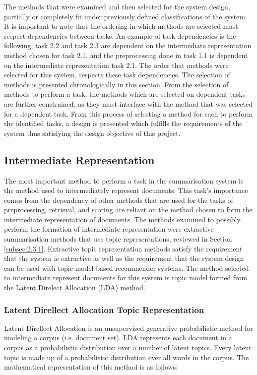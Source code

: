 The methods that were examined and then selected for the system design, partially or completely fit under previously defined classifications of the system. It is important to note that the ordering in which methods are selected must respect dependencies between tasks. An example of task dependencies is the following, task 2.2 and task 2.3 are dependent on the intermediate representation method chosen for task 2.1, and the preprocessing done in task 1.1 is dependent on the intermediate representation task 2.1. The order that methods were selected for this system, respects these task dependencies. The selection of methods is presented chronologically in this section. From the selection of methods to perform a task, the methods which are selected on dependent tasks are further constrained, as they must interface with the method that was selected for a dependent task. From this process of selecting a method for each to perform the identified tasks, a design is presented which fulfills the requirements of the system thus satisfying the design objective of this project.

\subsection{Intermediate Representation}
The most important method to perform a task in the summarisation system is the method used to intermediately represent documents. This task's importance comes from the dependency of other methods that are used for the tasks of preprocessing, retrieval, and scoring are reliant on the method chosen to form the intermediate representation of documents. The methods examined to possibly perform the formation of intermediate representation were extractive summarisation methods that use topic representations, reviewed in Section \ref{subsec:2.3.1}. Extractive topic representation methods satisfy the requirement that the system is extractive as well as the requirement that the system design can be used with topic model based recommender systems. The method selected to intermediate represent documents for this system is topic model formed from the Latent Direlect Allocation (LDA) method.

\subsubsection{Latent Direllect Allocation Topic Representation}
\label{subsec:3.5.1}
Latent Direllect Allocation is an unsupervised generative probabilistic method for modeling a corpus (i.e. document set). LDA represents each document in a corpus as a probabilistic distribution over a number of latent topics. Every latent topic is made up of a probabilistic distribution over all words in the corpus. The mathematical representation of this method is as follows:


